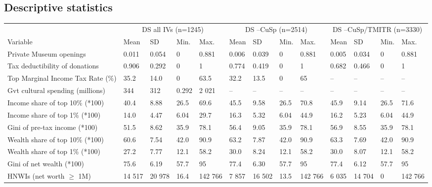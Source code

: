 \documentclass[11pt]{article}
\begin{document}
\begin{landscape}
\subsection{Descriptive statistics}
\label{app_descs}
\begin{table}[ht]
\centering
\begin{tabular}{p{7cm}llllllllllll}
  \hline 
  & \multicolumn{4}{c}{DS all IVs (n=1245)} & \multicolumn{4}{c}{DS --CuSp (n=2514)} & \multicolumn{4}{c}{DS --CuSp/TMITR (n=3330)} \\ 
\cmidrule(r){2-5}\cmidrule(r){6-9}\cmidrule(r){10-13}  
 Variable & Mean & SD & Min. & Max. & Mean & SD & Min. & Max. & Mean & SD & Min. & Max. \\ 
  \hline
Private Museum openings & 0.011 & 0.054 & 0 & 0.881 & 0.006 & 0.039 & 0 & 0.881 & 0.005 & 0.034 & 0 & 0.881 \\ 
  Tax deductibility of donations & 0.906 & 0.292 & 0 & 1 & 0.774 & 0.419 & 0 & 1 & 0.682 & 0.466 & 0 & 1 \\ 
  Top Marginal Income Tax Rate (\%) & 35.2 & 14.0 & 0 & 63.5 & 32.2 & 13.5 & 0 & 65 & -- & -- & -- & -- \\ 
  Gvt cultural spending (millions) & 344 & 312 & 0.292 & 2 021 & -- & -- & -- & -- & -- & -- & -- & -- \\ 
  Income share of top 10\% (*100) & 40.4 & 8.88 & 26.5 & 69.6 & 45.5 & 9.58 & 26.5 & 70.8 & 45.9 & 9.14 & 26.5 & 71.6 \\ 
  Income share of top 1\% (*100) & 14.0 & 4.47 & 6.04 & 29.7 & 16.3 & 5.32 & 6.04 & 44.9 & 16.2 & 5.23 & 6.04 & 44.9 \\ 
  Gini of pre-tax income (*100) & 51.5 & 8.62 & 35.9 & 78.1 & 56.4 & 9.05 & 35.9 & 78.1 & 56.9 & 8.55 & 35.9 & 78.1 \\ 
  Wealth share of top 10\% (*100) & 60.6 & 7.54 & 42.0 & 90.9 & 63.2 & 7.87 & 42.0 & 90.9 & 63.3 & 7.69 & 42.0 & 90.9 \\ 
  Wealth share of top 1\% (*100) & 27.2 & 7.77 & 12.1 & 58.2 & 30.0 & 8.24 & 12.1 & 58.2 & 30.0 & 8.07 & 12.1 & 58.2 \\ 
  Gini of net wealth (*100) & 75.6 & 6.19 & 57.7 & 95 & 77.4 & 6.30 & 57.7 & 95 & 77.4 & 6.12 & 57.7 & 95 \\ 
  HNWIs (net worth $\geq$ 1M) & 14 517 & 20 978 & 16.4 & 142 766 & 7 857 & 16 502 & 13.5 & 142 766 & 6 035 & 14 704 & 0 & 142 766 \\ 

\end{tabular}
\end{table}
\end{landscape}
\end{document}

